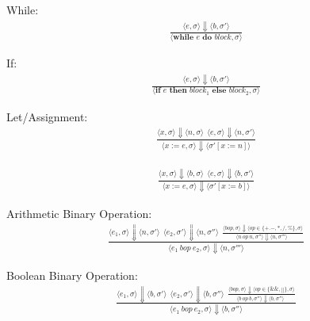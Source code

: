 \documentclass[12pt]{article}
\begin{document}
	While:
	\begin{align*}
		\frac{\langle e, \sigma \rangle\Downarrow \langle b, \sigma' \rangle}
		{\langle \textbf{while } e \textbf{ do } block, \sigma \rangle}
	\end{align*}

	If:
	\begin{align*}
		\frac{\langle e, \sigma \rangle\Downarrow \langle b, \sigma' \rangle}
		{\langle \textbf{if } e \textbf{ then } block_1 \textbf{ else } block_2, \sigma \rangle}
	\end{align*}

	Let/Assignment:
	\begin{align*}
		\frac{
			\langle x, \sigma \rangle\Downarrow \langle n, \sigma \rangle \ \ 
			\langle e, \sigma \rangle\Downarrow \langle n, \sigma' \rangle
		}
		{\langle x := e, \sigma \rangle\Downarrow \langle \sigma' [x := n] \rangle}
	\end{align*}

	\begin{align*}
		\frac{
			\langle x, \sigma \rangle\Downarrow \langle b, \sigma \rangle \ \ 
			\langle e, \sigma \rangle\Downarrow \langle b, \sigma' \rangle
		}
		{\langle x := e, \sigma \rangle\Downarrow \langle \sigma' [x := b] \rangle}
	\end{align*}


	Arithmetic Binary Operation:
	\begin{align*}
		\frac{
		\langle e_1, \sigma \rangle\Downarrow \langle n, \sigma' \rangle \ \ 
		\langle e_2, \sigma' \rangle\Downarrow \langle n, \sigma'' \rangle \ \ 
		\frac{
			\langle bop, \sigma \rangle\Downarrow \langle op \in \{+. -, *, /, \%\} , \sigma \rangle
		}{
			\langle n\ op\ n, \sigma'' \rangle\Downarrow \langle n, \sigma''' \rangle \ \ 
		}}
		{\langle e_1\ bop\ e_2, \sigma \rangle\Downarrow \langle n, \sigma''' \rangle}
	\end{align*}


	Boolean Binary Operation:
	\begin{align*}
		\frac{
		\langle e_1, \sigma \rangle\Downarrow \langle b, \sigma' \rangle \ \ 
		\langle e_2, \sigma' \rangle\Downarrow \langle b, \sigma'' \rangle \ \ 
		\frac{
			\langle bop, \sigma \rangle\Downarrow \langle op \in \{\&\&, ||\} , \sigma \rangle
		}{
			\langle b\ op\ b, \sigma'' \rangle\Downarrow \langle b, \sigma'' \rangle \ \ 
		}}
		{\langle e_1\ bop\ e_2, \sigma \rangle\Downarrow \langle b, \sigma'' \rangle}
	\end{align*}
\end{document}

